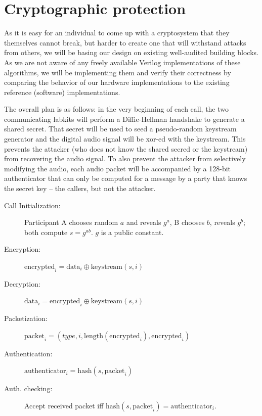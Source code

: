 \documentclass[a4paper]{report}
\begin{document}
\section{Cryptographic protection}

As it is easy for an individual to come up with a cryptosystem that they
themselves cannot break, but harder to create one that will withstand attacks
from others, we will be basing our design on existing well-audited building
blocks. As we are not aware of any freely available Verilog implementations of
these algorithms, we will be implementing them and verify their correctness by
comparing the behavior of our hardware implementations to the existing reference
(software) implementations.

The overall plan is as follows: in the very beginning of each call, the two
communicating labkits will perform a Diffie-Hellman handshake to generate a
shared secret. That secret will be used to seed a pseudo-random keystream
generator and the digital audio signal will be xor-ed with the keystream.
This prevents the attacker (who does not know the shared secred or the
keystream) from recovering the audio signal. To also prevent the attacker from
selectively modifying the audio, each audio packet will be accompanied by a
128-bit authenticator that can only be computed for a message by a party that
knows the secret key -- the callers, but not the attacker.

\begin{description}
  \item[Call Initialization:] Participant A chooses random $a$ and reveals $g^a$,
	  B chooses $b$, reveals $g^b$; both compute $s=g^{ab}$. $g$ is a public constant.
  \item[Encryption:] $\text{encrypted}_i = \text{data}_i \mathbin{\oplus} \text{keystream}(s,i)$
  \item[Decryption:] $\text{data}_i = \text{encrypted}_i \mathbin{\oplus} \text{keystream}(s,i)$
  \item[Packetization:] $\text{packet}_i = \left(type, i, \text{length}(\text{encrypted}_i), \text{encrypted}_i\right)$
  \item[Authentication:] $\text{authenticator}_i = \text{hash}(s, \text{packet}_i)$
  \item[Auth. checking:] Accept received packet iff $\text{hash}(s, \text{packet}_i) = \text{authenticator}_i$.
\end{description}
\end{document}
